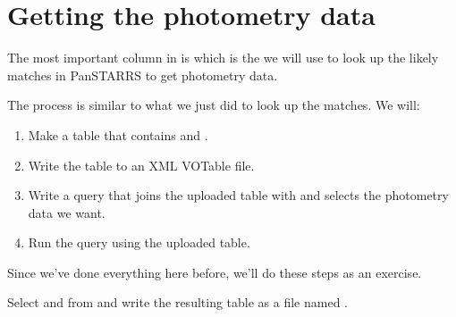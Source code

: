 \documentclass[letterpaper,10pt,english]{sphinxmanual}
\begin{document}
\section{Getting the photometry data}
\label{\detokenize{05_join:getting-the-photometry-data}}
The most important column in  is  which is the  we will use to look up the likely matches in Pan\sphinxhyphen{}STARRS to get photometry data.

The process is similar to what we just did to look up the matches.  We will:
\begin{enumerate}
%
\item {} 
Make a table that contains  and .

\item {} 
Write the table to an XML VOTable file.

\item {} 
Write a query that joins the uploaded table with  and selects the photometry data we want.

\item {} 
Run the query using the uploaded table.

\end{enumerate}

Since we’ve done everything here before, we’ll do these steps as an exercise.

 Select  and  from  and write the resulting table as a file named .

\begin{sphinxVerbatim}[commandchars=\\\{\}]

  \PYG{p}{[}\PYG{p}{[} \PYG{p}{]}\PYG{p}{]}
  
\end{sphinxVerbatim}
\end{document}
